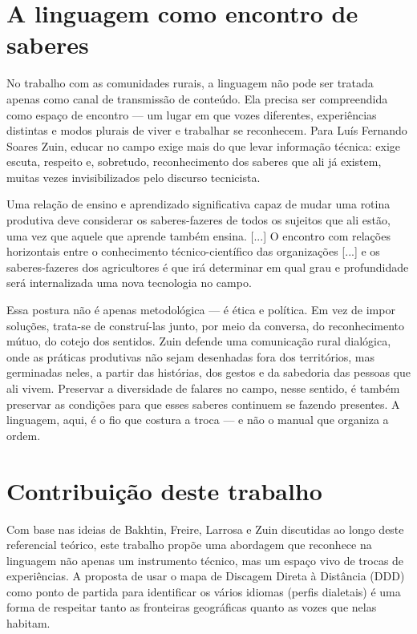 \section{A linguagem como encontro de saberes}

No trabalho com as comunidades rurais, a linguagem não pode ser tratada apenas como canal de transmissão de conteúdo. Ela precisa ser compreendida como espaço de encontro — um lugar em que vozes diferentes, experiências distintas e modos plurais de viver e trabalhar se reconhecem. Para Luís Fernando Soares Zuin, educar no campo exige mais do que levar informação técnica: exige escuta, respeito e, sobretudo, reconhecimento dos saberes que ali já existem, muitas vezes invisibilizados pelo discurso tecnicista.

\begin{citacao}
Uma relação de ensino e aprendizado significativa capaz de mudar uma rotina produtiva deve considerar os saberes-fazeres de todos os sujeitos que ali estão, uma vez que aquele que aprende também ensina. [...] O encontro com relações horizontais entre o conhecimento técnico-científico das organizações [...] e os saberes-fazeres dos agricultores é que irá determinar em qual grau e profundidade será internalizada uma nova tecnologia no campo.
\cite{zuin2021comunicacao}
\end{citacao}

Essa postura não é apenas metodológica — é ética e política. Em vez de impor soluções, trata-se de construí-las junto, por meio da conversa, do reconhecimento mútuo, do cotejo dos sentidos. Zuin defende uma comunicação rural dialógica, onde as práticas produtivas não sejam desenhadas fora dos territórios, mas germinadas neles, a partir das histórias, dos gestos e da sabedoria das pessoas que ali vivem. Preservar a diversidade de falares no campo, nesse sentido, é também preservar as condições para que esses saberes continuem se fazendo presentes. A linguagem, aqui, é o fio que costura a troca — e não o manual que organiza a ordem.



\section{Contribuição deste trabalho}

Com base nas ideias de Bakhtin, Freire, Larrosa e Zuin discutidas ao longo deste referencial teórico, este trabalho propõe uma abordagem que reconhece na linguagem não apenas um instrumento técnico, mas um espaço vivo de trocas de experiências. A proposta de usar o mapa de Discagem Direta à Distância (DDD) como ponto de partida para identificar os vários idiomas (perfis dialetais) é uma forma de respeitar tanto as fronteiras geográficas quanto as vozes que nelas habitam.

